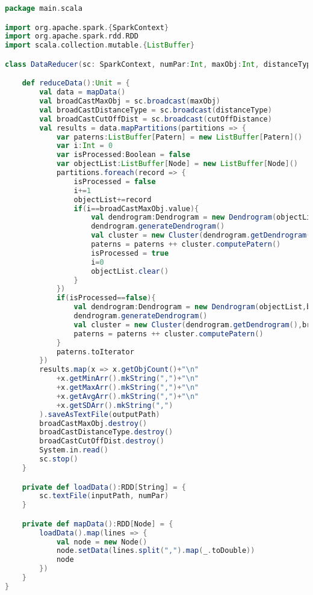 \begin{lstlisting}[language=Scala, caption=DataReducer.scala]
package main.scala

import org.apache.spark.{SparkContext}
import org.apache.spark.rdd.RDD
import scala.collection.mutable.{ListBuffer}

class DataReducer(sc: SparkContext, numPar:Int, maxObj:Int, distanceType:Int, cutOffDistance:Double, inputPath: String, outputPath:String) extends Serializable {

    def reduceData():Unit = {
        val data = mapData()
        val broadCastMaxObj = sc.broadcast(maxObj)
        val broadCastDistanceType = sc.broadcast(distanceType)
        val broadCastCutOffDist = sc.broadcast(cutOffDistance)
        val results = data.mapPartitions(partitions => {
            var paterns:ListBuffer[Patern] = new ListBuffer[Patern]()
            var i:Int = 0
            var isProcessed:Boolean = false
            var objectList:ListBuffer[Node] = new ListBuffer[Node]()
            partitions.foreach(record => {
                isProcessed = false
                i+=1
                objectList+=record
                if(i==broadCastMaxObj.value){
                    val dendrogram:Dendrogram = new Dendrogram(objectList,broadCastDistanceType.value)
                    dendrogram.generateDendrogram()
                    val cluster = new Cluster(dendrogram.getDendrogram(),broadCastCutOffDist.value)
                    paterns = paterns ++ cluster.computePatern()
                    isProcessed = true
                    i=0
                    objectList.clear()
                }
            })
            if(isProcessed==false){
                val dendrogram:Dendrogram = new Dendrogram(objectList,broadCastDistanceType.value)
                dendrogram.generateDendrogram()
                val cluster = new Cluster(dendrogram.getDendrogram(),broadCastCutOffDist.value)
                paterns = paterns ++ cluster.computePatern()
            }
            paterns.toIterator
        })
        results.map(x => x.getObjCount()+"\n"
            +x.getMinArr().mkString(",")+"\n"
            +x.getMaxArr().mkString(",")+"\n"
            +x.getAvgArr().mkString(",")+"\n"
            +x.getSDArr().mkString(",")
        ).saveAsTextFile(outputPath)
        broadCastMaxObj.destroy()
        broadCastDistanceType.destroy()
        broadCastCutOffDist.destroy()
        System.in.read()
        sc.stop()
    }

    private def loadData():RDD[String] = {
        sc.textFile(inputPath, numPar)
    }

    private def mapData():RDD[Node] = {
        loadData().map(lines => {
            val node = new Node()
            node.setData(lines.split(",").map(_.toDouble))
            node
        })
    }
}
\end{lstlisting}


